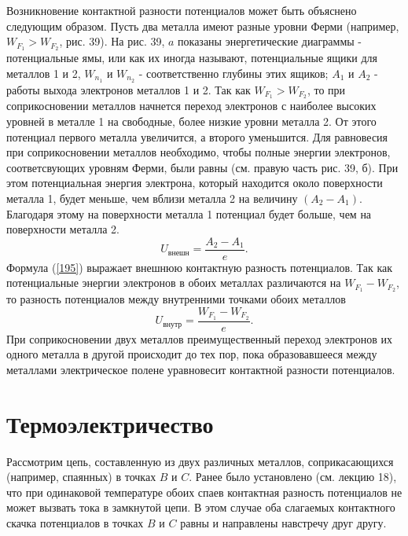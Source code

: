 \documentclass[a4paper,10pt]{book}
\begin{document}
Возникновение контактной разности потенциалов может быть объяснено следующим образом. Пусть два металла имеют разные уровни Ферми (например, $W_{F_1} > W_{F_2}$, рис. 39). На рис. 39, $a$ показаны энергетические диаграммы - потенциальные ямы, или как их иногда называют, потенциальные ящики для металлов 1 и 2, 
$W_{n_1}$ и $W_{n_2}$ - соответственно глубины этих ящиков; $A_1$ и $A_2$ - работы выхода электронов металлов 1 и 2. Так как $W_{F_1} > W_{F_2}$, то при соприкосновении металлов начнется переход электронов с наиболее высоких уровней в металле 1 на свободные, более низкие уровни металла 2. От этого потенциал первого металла увеличится, а второго уменьшится. Для равновесия при соприкосновении металлов необходимо, чтобы полные энергии электронов, соответсвующих уровням Ферми, были равны (см.  правую часть рис. 39, б). При этом потенциальная энергия электрона, который находится около поверхности металла 1, будет меньше, чем вблизи металла 2 на величину $(A_2 - A_1)$. Благодаря этому на поверхности металла 1 потенциал будет больше, чем на поверхности металла 2.
\begin{equation}\label{195}
 U_\textit{внешн} = \frac{A_2 - A_1}{e}.
\end{equation}
Формула (\ref{195}) выражает внешнюю контактную разность потенциалов. Так как потенциальные энергии электронов в обоих металлах различаются на $W_{F_1} - W_{F_2}$, то разность потенциалов между внутренними точками обоих металлов 
\begin{equation}\label{196}
 U_\textit{внутр} = \frac{W_{F_1} - W_{F_2}}{e}.
\end{equation}
При соприкосновении двух металлов преимущественный переход электронов их одного металла в другой происходит до тех пор, пока образовавшееся между металлами электрическое полене уравновесит контактной разности потенциалов.
\section{Термоэлектричество}
Рассмотрим цепь, составленную из двух различных металлов, соприкасающихся (например, спаянных) в точках $B$ и $C$. Ранее было установлено (см. лекцию 18), что при одинаковой температуре обоих спаев контактная разность потенциалов не может вызвать тока в замкнутой цепи. В этом случае оба слагаемых контактного скачка потенциалов в точках $B$ и $C$ равны и направлены навстречу друг другу.
\end{document}
